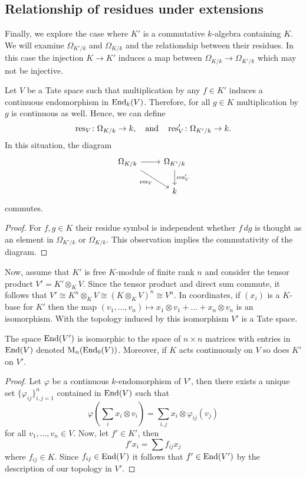\subsection*{Relationship of residues under extensions}
Finally, we explore the case where $K'$ is a commutative $k$-algebra containing $K$. We will examine $\Omega_{K'/k}$ and $\Omega_{K/k}$ and the relationship between their residues. In this case the injection $K \to K'$ induces a map between $\Omega_{K/k} \to \Omega_{K'/k}$ which may not be injective. 
\begin{proposition}\label{prop:residue-commutes-extension}
	Let $V$ be a Tate space such that multiplication by any $f\in K'$ induces a continuous endomorphism in $\operatorname{End}_{k}(V)$. Therefore, for all $g\in K$ multiplication by $g$ is continuous as well. Hence, we can define
\[
	\operatorname{res}_{V}\colon\Omega_{K/k} \to k, \quad\text{and}\quad \operatorname{res}_{V}'\colon \Omega_{K'/k}\to k.
\]
In this situation, the diagram
\[
\begin{tikzcd}
	\Omega_{K/k} \arrow[r] \arrow[dr, swap, "\res_{V}"] & \Omega_{K'/k} \arrow[d, "\res_{V}'"] \\
	& k  
\end{tikzcd}
\]
commutes.
\end{proposition}
\begin{proof}
	For $f,g \in K$ their residue symbol is independent whether $f\,dg$ is thought as an element in $\Omega_{K'/k}$ or $\Omega_{K/k}$. This observation implies the commutativity of the diagram.
\end{proof}
Now, assume that $K'$ is free $K$-module of finite rank $n$ and consider the tensor product $V' = K' \otimes_{K} V$. Since the tensor product and direct sum commute, it follows that $V' \cong K^{n} \otimes_{K} V \cong (K \otimes_{K} V)^{n}\cong V^{n}$. In coordinates, if $(x_{i})$ is a $K$-base for $K'$ then the map $(v_{1}, \ldots, v_{n}) \mapsto x_{1}\otimes v_{1} + \ldots + x_{n}\otimes v_{n}$ is an isomorphism. With the topology induced by this isomorphism $V'$ is a Tate space.
\begin{proposition}\label{prop:identification-matrices-entries-in-endomorphisms}
	The space $\operatorname{End}(V')$ is isomorphic to the space of $n \times n$ matrices with entries in $\operatorname{End}(V)$ denoted $\operatorname{M}_{n}(\operatorname{End}_{0}(V))$. Moreover, if $K$ acts continuously on $V$ so does $K'$ on $V'$.
\end{proposition}
\begin{proof}
	Let $\varphi$ be a continuous $k$-endomorphism of $V'$, then there exists a unique set $\{\varphi_{ij}\}_{i,j=1}^{n}$ contained in $\operatorname{End}(V)$ such that
	\[
	\varphi\left(\sum_{i} x_{i} \otimes v_{i}\right) = \sum_{i,j} x_{i} \otimes \varphi_{ij}(v_{j})
	\]
	for all $v_{1}, \ldots, v_{n} \in V$. Now, let $f' \in K'$, then
	\[
		f'x_{i} = \sum f_{ij}x_{j}
	\]
	where $f_{ij}\in K$. Since $f_{ij}\in\operatorname{End}(V)$ it follows that $f' \in \operatorname{End}(V')$ by the description of our topology in $V'$.
\end{proof}
